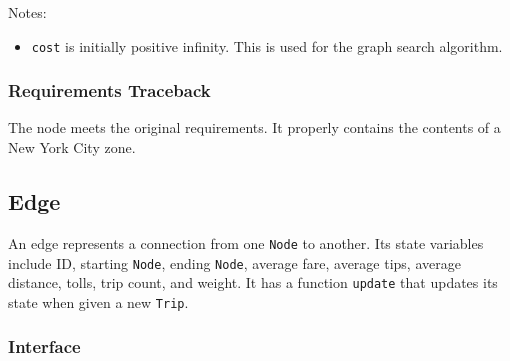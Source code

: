 \documentclass[12pt]{article}
\newcommand{\bi}{\begin{itemize}}
\newcommand{\ei}{\end{itemize}}
\newcommand{\code}[1]{\texttt{#1}}
\begin{document}
\noindent Notes:
\bi
    \item \code{cost} is initially positive infinity. This is used for the graph search algorithm.
\ei

\subsubsection{Requirements Traceback}

The node meets the original requirements. It properly contains the contents of a New York City zone.

\newpage

\subsection{Edge}

An edge represents a connection from one \code{Node} to another. Its state variables include ID, starting \code{Node}, ending \code{Node}, average fare, average tips, average distance, tolls, trip count, and weight. It has a function \code{update} that updates its state when given a new \code{Trip}.

\subsubsection{Interface}
\end{document}
